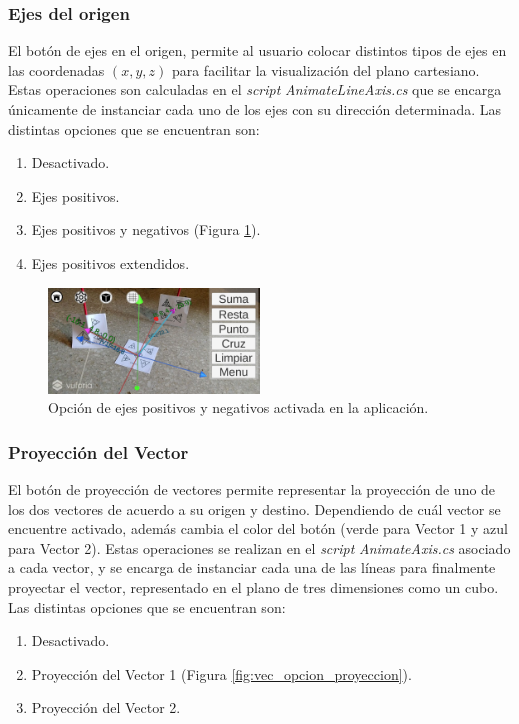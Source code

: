 \subsubsection{Ejes del origen}
El botón de ejes en el origen, permite al usuario colocar distintos tipos de ejes en las coordenadas $(x,y,z)$ para facilitar la visualización del plano cartesiano. Estas operaciones son calculadas en el \textit{script} \textit{AnimateLineAxis.cs} que se encarga únicamente de instanciar cada uno de los ejes con su dirección determinada.  Las distintas opciones que se encuentran son:

\begin{enumerate}
    \item Desactivado.
    \item Ejes positivos.
    \item Ejes positivos y negativos (Figura \ref{fig:vec_opcion_ejes}).
    \item Ejes positivos extendidos.
\end{enumerate}

\begin{figure}[hbt!]
\centering
\includegraphics[width=0.5\textwidth]{figuras/vectores/Ejes.png}
\caption{\label{fig:vec_opcion_ejes}Opción de ejes positivos y negativos activada en la aplicación.}
\end{figure}
\FloatBarrier

\subsubsection{Proyección del Vector}
El botón de proyección de vectores permite representar la proyección de uno de los dos vectores de acuerdo a su origen y destino. Dependiendo de cuál vector se encuentre activado, además cambia el color del botón (verde para Vector 1 y azul para Vector 2). Estas operaciones se realizan en el \textit{script} \textit{AnimateAxis.cs} asociado a cada vector, y se encarga de instanciar cada una de las líneas para finalmente proyectar el vector, representado en el plano de tres dimensiones como un cubo. Las distintas opciones que se encuentran son:

\begin{enumerate}
    \item Desactivado.
    \item Proyección del Vector 1 (Figura \ref{fig:vec_opcion_proyeccion}).
    \item Proyección del Vector 2.
\end{enumerate}

